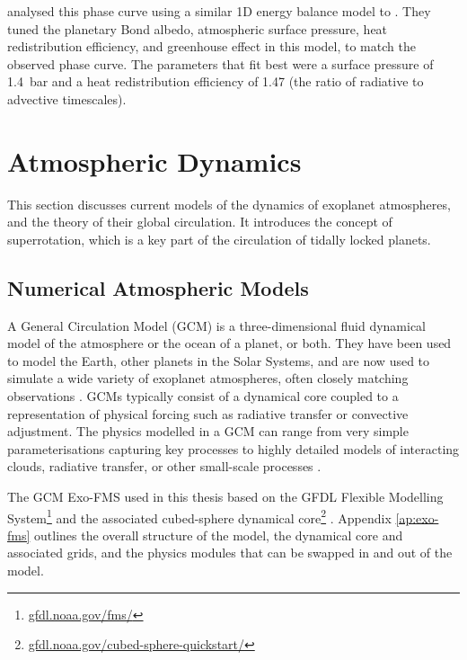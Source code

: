 \citet{angelo201755cnce} analysed this phase curve using a similar 1D energy balance model to \citet{zhang2017dynamics}. They tuned the planetary Bond albedo, atmospheric surface pressure, heat redistribution efficiency, and greenhouse effect in this model, to match the observed phase curve. The parameters that fit best were a surface pressure of \SI{1.4}{\bar} and a heat redistribution efficiency of 1.47 (the ratio of radiative to advective timescales).




\section{Atmospheric Dynamics}

This section discusses current models of the dynamics of exoplanet atmospheres, and the theory of their global circulation. It introduces the concept of superrotation, which is a key part of the circulation of tidally locked planets.

\subsection{Numerical Atmospheric Models}

A General Circulation Model (GCM) is a three-dimensional fluid dynamical model of the atmosphere or the ocean of a planet, or both. They have been used to model the Earth, other planets in the Solar Systems, and are now used to simulate a wide variety of exoplanet atmospheres, often closely matching observations \citep{heng2015review, arcangeli2019climate}. GCMs typically consist of a dynamical core coupled to a representation of physical forcing such as radiative transfer or convective adjustment. The physics modelled in a GCM can range from very simple parameterisations capturing key processes \citep{held1994proposal} to highly detailed models of interacting clouds, radiative transfer, or other small-scale processes \citep{lines2018simulating, drummond2018observable}.

The GCM Exo-FMS used in this thesis based on the GFDL Flexible Modelling System\footnote{\url{gfdl.noaa.gov/fms/}} and the associated cubed-sphere dynamical core\footnote{\url{gfdl.noaa.gov/cubed-sphere-quickstart/}} \citep{ding2016convection, pierrehumbert2016dynamics, hammond2017climate, hammond2018wavemean}. Appendix \ref{ap:exo-fms} outlines the overall structure of the model, the dynamical core and associated grids, and the physics modules that can be swapped in and out of the model.

